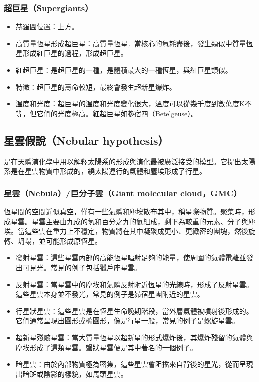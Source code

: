 \documentclass[a4paper,12pt]{report}
\begin{document}
\subsubsection{超巨星（Supergiants）}
\begin{itemize}
\item 赫羅圖位置：上方。
\item 高質量恆星形成超巨星：高質量恆星，當核心的氫耗盡後，發生類似中質量恆星形成紅巨星的過程，形成超巨星。
\item 紅超巨星：是超巨星的一種，是體積最大的一種恆星，與紅巨星類似。
\item 特徵：超巨星的壽命較短，最終會發生超新星爆炸。
\item 溫度和光度：超巨星的溫度和光度變化很大，溫度可以從幾千度到數萬度K不等，但它們的光度極高。紅超巨星如參宿四（Betelgeuse）。
\end{itemize}
\subsection{星雲假說（Nebular hypothesis）}
是在天體演化學中用以解釋太陽系的形成與演化最被廣泛接受的模型。它提出太陽系是在星雲物質中形成的，繞太陽運行的氣體和塵埃形成了行星。
\subsubsection{星雲（Nebula）/巨分子雲（Giant molecular cloud，GMC）}
恆星間的空間近似真空，僅有一些氣體和塵埃散布其中，稱星際物質。聚集時，形成星雲。星雲主要由九成的氫和百分之九的氦組成，剩下為較重的元素、分子與塵埃。當這些雲在重力上不穩定，物質將在其中凝聚成更小、更緻密的團塊，然後旋轉、坍塌，並可能形成原恆星。
\begin{itemize}
\item 發射星雲：這些星雲內部的高能恆星輻射足夠的能量，使周圍的氣體電離並發出可見光。常見的例子包括獵戶座星雲。
\item 反射星雲：當星雲中的塵埃和氣體反射附近恆星的光線時，形成了反射星雲。這些星雲本身並不發光，常見的例子是昴宿星團附近的星雲。
\item 行星狀星雲：這些星雲是在恆星生命晚期階段，當外層氣體被噴射後形成的。它們通常呈現出圓形或橢圓形，像是行星一般，常見的例子是螺旋星雲。
\item 超新星殘骸星雲：當大質量恆星以超新星的形式爆炸後，其爆炸殘留的氣體與塵埃形成了這類星雲。蟹狀星雲便是其中著名的一個例子。
\item 暗星雲：由於內部物質極為密集，這些星雲會阻擋來自背後的星光，從而呈現出暗斑或陰影的樣貌，如馬頭星雲。
\end{itemize}
\end{document}
